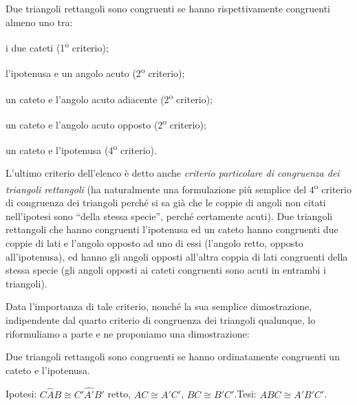 \begin{teorema}
Due triangoli rettangoli sono congruenti se hanno rispettivamente congruenti almeno uno tra:
\begin{itemize*}
\item i due cateti (1\textsuperscript{o} criterio);
\item l'ipotenusa e un angolo acuto (2\textsuperscript{o} criterio);
\item un cateto e l'angolo acuto adiacente (2\textsuperscript{o} criterio);
\item un cateto e l'angolo acuto opposto (2\textsuperscript{o} criterio);
\item un cateto e l'ipotenusa (4\textsuperscript{o} criterio).
\end{itemize*}
\end{teorema}

L'ultimo criterio dell'elenco è detto anche \emph{criterio particolare di congruenza dei triangoli rettangoli} (ha naturalmente una formulazione più semplice del 4\textsuperscript{o} criterio di congruenza dei triangoli perché si sa già che le coppie di angoli non citati nell'ipotesi sono ``della stessa specie'', perché certamente acuti). Due triangoli rettangoli che hanno congruenti l'ipotenusa ed un cateto hanno congruenti due coppie di lati e l'angolo opposto ad uno di essi (l'angolo retto, opposto all'ipotenusa), ed hanno gli angoli opposti all'altra coppia di lati congruenti della stessa specie (gli angoli opposti ai cateti congruenti sono acuti in entrambi i triangoli). 

Data l'importanza di tale criterio, nonché la sua semplice dimostrazione, indipendente dal quarto criterio di congruenza dei triangoli qualunque, lo riformuliamo a parte e ne proponiamo una dimostrazione:
\begin{teorema}
Due triangoli rettangoli sono congruenti se hanno ordinatamente congruenti un cateto e l'ipotenusa.
\end{teorema}

\noindent Ipotesi: $C\widehat{A}B\cong C'\widehat{A'}B'$ retto, $AC\cong A'C'$, $BC\cong B'C'$.\tab\tab Tesi: $ABC\cong A'B'C'$.

\begin{figure}[htb]
\centering
\end{figure}

